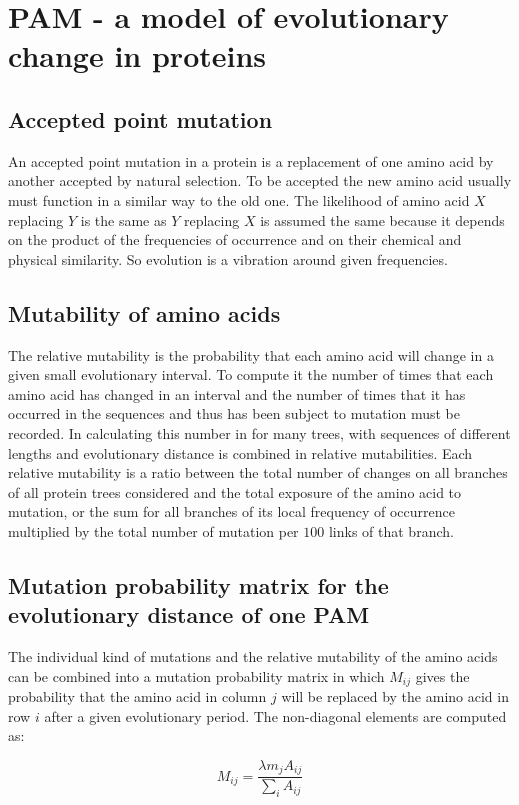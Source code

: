 \chapter{PAM - a model of evolutionary change in proteins}

\section{Accepted point mutation}
An accepted point mutation in a protein is a replacement of one amino acid by another accepted by natural selection.
To be accepted the new amino acid usually must function in a similar way to the old one.
The likelihood of amino acid $X$ replacing $Y$ is the same as $Y$ replacing $X$ is assumed the same because it depends on the product of the frequencies of occurrence and on their chemical and physical similarity.
So evolution is a vibration around given frequencies.

\section{Mutability of amino acids}
The relative mutability is the probability that each amino acid will change in a given small evolutionary interval.
To compute it the number of times that each amino acid has changed in an interval and the number of times that it has occurred in the sequences and thus has been subject to mutation must be recorded.
In calculating this number in for many trees, with sequences of different lengths and evolutionary distance is combined in relative mutabilities.
Each relative mutability is a ratio between the total number of changes on all branches of all protein trees considered and the total exposure of the amino acid to mutation, or the sum for all branches of its local frequency of occurrence multiplied by the total number of mutation per $100$ links of that branch.

\section{Mutation probability matrix for the evolutionary distance of one PAM}
The individual kind of mutations and the relative mutability of the amino acids can be combined into a mutation probability matrix in which $M_{ij}$ gives the probability that the amino acid in column $j$ will be replaced by the amino acid in row $i$ after a given evolutionary period.
The non-diagonal elements are computed as:

$$M_{ij} = \frac{\lambda m_jA_{ij}}{\sum\limits_iA_{ij}}$$

